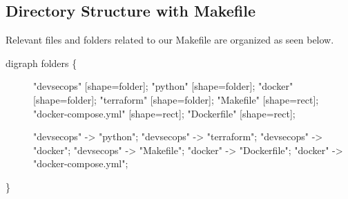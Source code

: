 \clearpage

\hypertarget{directory-structure-with-makefile}{%
\subsection{Directory Structure with
Makefile}\label{directory-structure-with-makefile}}

Relevant files and folders related to our Makefile are organized as seen
below.

\begin{description}
\item[digraph folders \{]
"devsecops" {[}shape=folder{]}; "python" {[}shape=folder{]}; "docker"
{[}shape=folder{]}; "terraform" {[}shape=folder{]}; "Makefile"
{[}shape=rect{]}; "docker-compose.yml" {[}shape=rect{]}; "Dockerfile"
{[}shape=rect{]};

"devsecops" -\textgreater{} "python"; "devsecops" -\textgreater{}
"terraform"; "devsecops" -\textgreater{} "docker"; "devsecops"
-\textgreater{} "Makefile"; "docker" -\textgreater{} "Dockerfile";
"docker" -\textgreater{} "docker-compose.yml";
\end{description}

\}
